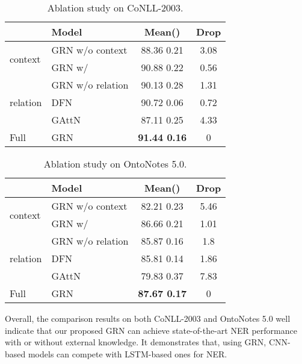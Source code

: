 \documentclass[letterpaper]{article} \usepackage{aaai19}  \usepackage{times}  \usepackage{helvet}  \usepackage{courier}  \usepackage{url}  \usepackage{graphicx}  \usepackage{amsmath}
\newcommand{\GAN}{GAttN}
\newcommand{\GRN}{GRN}
\begin{document}
\begin{table}[t!]
  \centering
    \begin{adjustbox}{max width=0.9\columnwidth}
    \begin{tabular}{|l|l|c|c|}
      \hline
       &Model & Mean()  &  Drop  \\ \hline
       \multirow{2}{*}{context} &\GRN{} w/o context & 88.36  0.21 & 3.08 \\ \cline{2-4}
        &\GRN{} w/  & 90.88  0.22 & 0.56 \\ \hline
       \hline
       \multirow{3}{*}{relation} &\GRN{} w/o relation & 90.13  0.28 & 1.31\\ \cline{2-4}
       &DFN & 90.72  0.06  & 0.72\\ \cline{2-4}
       &\GAN{} & 87.11  0.25  & 4.33\\ \hline
       \hline
       Full&\GRN{} & \textbf{91.44  0.16}  & 0\\ \hline
    \end{tabular}
    \end{adjustbox}
    \caption{Ablation study on CoNLL-2003.}\label{tab:compare_ablation_conll}
\end{table}

\begin{table}[t!]
  \centering
    \begin{adjustbox}{max width=0.9\columnwidth}
    \begin{tabular}{|l|l|c|c|}
      \hline
       &Model & Mean()  &  Drop  \\ \hline
       \multirow{2}{*}{context} &\GRN{} w/o context & 82.21  0.23 & 5.46 \\ \cline{2-4}
        &\GRN{} w/  & 86.66  0.21 & 1.01 \\ \hline
       \hline
       \multirow{3}{*}{relation} &\GRN{} w/o relation & 85.87  0.16 & 1.8 \\ \cline{2-4}
       &DFN & 85.81  0.14  & 1.86\\ \cline{2-4}
       &\GAN{} & 79.83  0.37  & 7.83\\ \hline
       \hline
       Full&\GRN{} & \textbf{87.67  0.17}  & 0\\ \hline
    \end{tabular}
    \end{adjustbox}
    \caption{Ablation study on OntoNotes 5.0.}\label{tab:compare_ablation_ontonote}
\end{table}

Overall, the comparison results on both CoNLL-2003 and OntoNotes 5.0 well indicate that our proposed \GRN{} can achieve state-of-the-art NER performance with or without external knowledge. It demonstrates that, using \GRN{}, CNN-based models can compete with LSTM-based ones for NER.
\end{document}
